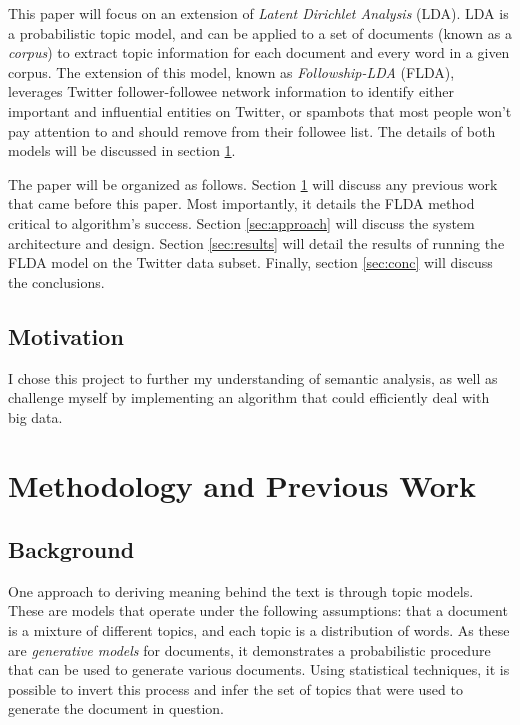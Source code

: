 \documentclass[a4paper]{article}
\begin{document}
\begin{multicols}{2}
This paper will focus on an extension of \textit{Latent Dirichlet Analysis} (LDA). LDA is a probabilistic topic model, and can be applied to a set of documents (known as a \textit{corpus}) to extract topic information for each document and every word in a given corpus. The extension of this model, known as \textit{Followship-LDA} (FLDA), leverages Twitter follower-followee network information to identify either important and influential entities on Twitter, or spambots that most people won't pay attention to and should remove from their followee list. The details of both models will be discussed in section \ref{sec:prevwork}.

The paper will be organized as follows. Section \ref{sec:prevwork} will discuss any previous work that came before this paper. Most importantly, it details the FLDA method critical to algorithm's success. Section \ref{sec:approach} will discuss the system architecture and design. Section \ref{sec:results} will detail the results of running the FLDA model on the Twitter data subset. Finally, section \ref{sec:conc} will discuss the conclusions.

\subsection{Motivation}
I chose this project to further my understanding of semantic analysis, as well as challenge myself by implementing an algorithm that could efficiently deal with big data.


\section{Methodology and Previous Work}
\label{sec:prevwork}
\subsection{Background}
One approach to deriving meaning behind the text is through topic models. These are models that operate under the following assumptions: that a document is a mixture of different topics, and each topic is a distribution of words. As these are \textit{generative models} for documents, it demonstrates a probabilistic procedure that can be used to generate various documents. Using statistical techniques, it is possible to invert this process and infer the set of topics that were used to generate the document in question. 


\end{multicols}
\end{document}
